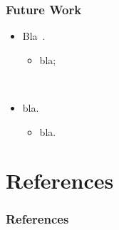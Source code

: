 \documentclass{beamer}
\begin{document}
\begin{frame}
  \frametitle{Future Work}

  \begin{itemize}
    \item Bla~\cite{rabiner_fundamentals_1993}.
      \begin{itemize}
        \item bla; 
      \end{itemize}
      ~

    \item bla.
      \begin{itemize}
        \item bla.
      \end{itemize}
  \end{itemize}
\end{frame}


\appendix
\section*{References}
\begin{frame}[allowframebreaks]
  \frametitle{References}
  {\scriptsize
    
      
  }
\end{frame}
\end{document}
